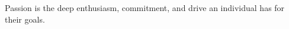 \documentclass[preview]{standalone}
\begin{document}
\begin{center}
Passion is the deep enthusiasm, commitment, and drive an individual has for their goals.
\end{center}
\end{document}
